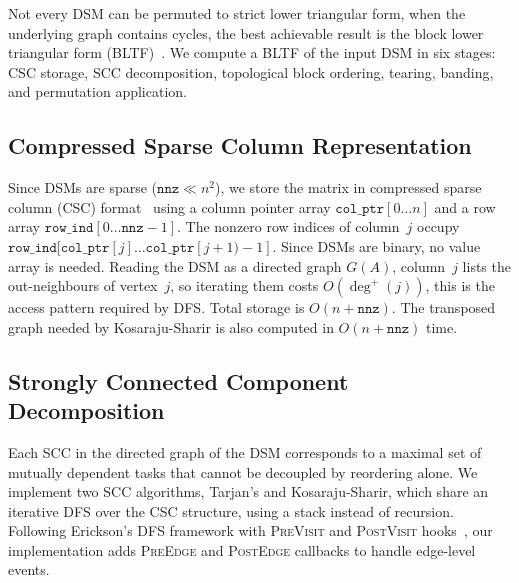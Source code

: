 \documentclass[12pt]{article}
\theoremstyle{definition}
\begin{document}
Not every DSM can be permuted to strict lower triangular form, when the underlying graph contains cycles, the best achievable result is the block lower triangular form (BLTF)~\cite{hossain_addendum}. We compute a BLTF of the input DSM in six stages: CSC storage, SCC decomposition, topological block ordering, tearing, banding, and permutation application.

\subsection{Compressed Sparse Column Representation}

Since DSMs are sparse ($\mathtt{nnz} \ll n^2$), we store the matrix in compressed sparse column (CSC) format~\cite{barrett1994templates,hossain_addendum} using a column pointer array $\texttt{col\_ptr}[0 \ldots n]$ and a row array $\texttt{row\_ind}[0 \ldots \mathtt{nnz}{-}1]$. The nonzero row indices of column~$j$ occupy $\texttt{row\_ind}[\texttt{col\_ptr}[j] \ldots \texttt{col\_ptr}[j{+}1){-}1]$. Since DSMs are binary, no value array is needed. Reading the DSM as a directed graph $G(A)$, column~$j$ lists the out-neighbours of vertex~$j$, so iterating them costs $O(\deg^+(j))$, this is the access pattern required by DFS. Total storage is $O(n + \mathtt{nnz})$. The transposed graph needed by Kosaraju-Sharir is also computed in $O(n + \mathtt{nnz})$ time.

\subsection{Strongly Connected Component Decomposition}\label{sec:scc}

Each SCC in the directed graph of the DSM corresponds to a maximal set of mutually dependent tasks that cannot be decoupled by reordering alone. We implement two SCC algorithms, Tarjan's and Kosaraju-Sharir, which share an iterative DFS over the CSC structure, using a stack instead of recursion. Following Erickson's DFS framework with \textsc{PreVisit} and \textsc{PostVisit} hooks~\cite{erickson2019algorithms}, our implementation adds \textsc{PreEdge} and \textsc{PostEdge} callbacks to handle edge-level events.
\end{document}
